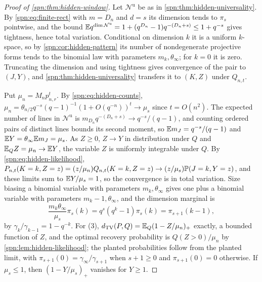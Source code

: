 \begin{proof}[Proof of \cref{spn:thm:hidden-window}]
Let $\mathcal N^{\mathrm u}$ be as in \cref{spn:thm:hidden-universality}. By \eqref{spn:eq:finite-rect}
with $m=D_n$ and $d=s$ its dimension tends to $\pi_s$ pointwise, and the bound
$\mathbb{E} q^{\dim\mathcal N^{\mathrm u}}=1+(q^{D_n}-1)q^{-(D_n+s)}\le1+q^{-s}$ gives tightness, hence
total variation. Conditional on dimension $k$ it is a uniform $k$-space, so by
\cref{spn:cor:hidden-pattern} its number of nondegenerate projective forms tends to the binomial law
with parameters $m_k,\theta_\infty$; for $k=0$ it is zero. Truncating the dimension and using
tightness gives convergence of the pair to $(J,Y)$, and \cref{spn:thm:hidden-universality} transfers
it to $(K,Z)$ under $Q_{n,t}$.

Put $\mu_n=M_np_{n,r}^t$. By \eqref{spn:eq:hidden-counts}, $\mu_n=\theta_{n/2}q^{-s}(q-1)^{-1}
(1+O(q^{-n}))^t\to\mu_s$ since $t=O(n^2)$. The expected number of lines in $\mathcal N^{\mathrm u}$ is
$m_{D_n}q^{-(D_n+s)}\to q^{-s}/(q-1)$, and counting ordered pairs of distinct lines bounds its second
moment, so $\mathbb{E} m_J=q^{-s}/(q-1)$ and $\mathbb{E} Y=\theta_\infty\mathbb{E} m_J=\mu_s$. As $Z\ge0$, $Z\to Y$ in
distribution under $Q$ and $\mathbb{E}_QZ=\mu_n\to\mathbb{E} Y$, the variable $Z$ is uniformly integrable under
$Q$. By \eqref{spn:eq:hidden-likelihood},
$P_{n,t}(K=k,Z=z)=(z/\mu_n)Q_{n,t}(K=k,Z=z)\to(z/\mu_s)\mathbb{P}(J=k,Y=z)$, and these limits sum to
$\mathbb{E} Y/\mu_s=1$, so the convergence is in total variation. Size biasing a binomial variable with
parameters $m_k,\theta_\infty$ gives one plus a binomial variable with parameters $m_k-1,\theta_\infty$,
and the dimension marginal is
\[
 \frac{m_k\theta_\infty}{\mu_s}\pi_s(k)=q^s(q^k-1)\pi_s(k)=\pi_{s+1}(k-1),
\]
by $\gamma_k/\gamma_{k-1}=1-q^{-k}$. For (3), $d_{\mathrm{TV}}(P,Q)=\mathbb{E}_Q(1-Z/\mu_n)_+$ exactly, a bounded
function of $Z$, and the optimal recovery probability is $Q(Z>0)/\mu_n$ by
\cref{spn:lem:hidden-likelihood}; the planted probabilities follow from the planted limit, with
$\pi_{s+1}(0)=\gamma_\infty/\gamma_{s+1}$ when $s+1\ge0$ and $\pi_{s+1}(0)=0$ otherwise. If $\mu_s\le1$,
then $(1-Y/\mu_s)_+$ vanishes for $Y\ge1$.
\end{proof}


